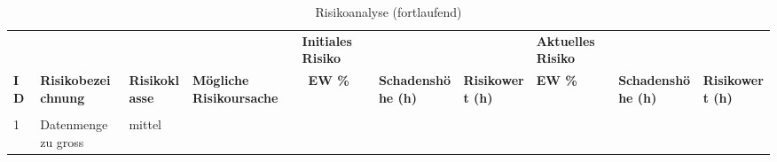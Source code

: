 \begin{landscape}
\begin{table}[H]
\scriptsize
\caption{Risikoanalyse (fortlaufend)}
\begin{tabular}{p{0.5cm}p{4cm} p{1.5cm} p{1.5cm} p{1cm} p{2cm}p{1.5cm}p{1cm}p{2cm}p{1.5cm}}
\hline & & & & \bf Initiales Risiko \cellcolor{lightgray} & \cellcolor{lightgray} & \cellcolor{lightgray} & \bf Aktuelles Risiko & & \\ [13pt]
\bf \bf ID & \bf Risikobezeichnung & \bf Risikoklasse & \bf Mögliche Risikoursache & \ \bf EW \% \cellcolor{lightgray} & \bf Schadenshöhe (h) \cellcolor{lightgray} & \bf Risikowert (h) \cellcolor{lightgray} & \bf EW \% & \bf Schadenshöhe (h) & \bf Risikowert (h) \\
\hline
&&&&&&&&&\\
1 & Datenmenge zu gross & mittel \cellcolor{yellow!50} &&&&&&&\\


\hline
\end{tabular}
\end{table}
\end{landscape}